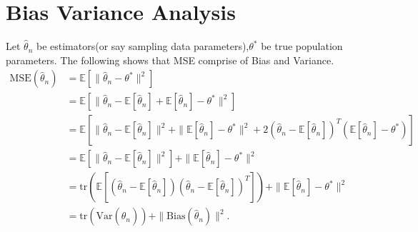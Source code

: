 \documentclass{article}
\begin{document}
\section{Bias Variance Analysis} 
Let \(\hat{\theta}_n\) be estimators(or say sampling data parameters),\(\theta^*\) be true population parameters. The following shows that MSE comprise of Bias and Variance. 
\begin{align*}
\text{MSE}(\hat{\theta}_n) &= \mathbb{E} \left[ \| \hat{\theta}_n - \theta^* \|^2 \right] \\
&= \mathbb{E} \left[ \| \hat{\theta}_n - \mathbb{E}[\hat{\theta}_n] + \mathbb{E}[\hat{\theta}_n] - \theta^* \|^2 \right] \\
&= \mathbb{E} \left[ \| \hat{\theta}_n - \mathbb{E}[\hat{\theta}_n] \|^2 + \| \mathbb{E}[\hat{\theta}_n] - \theta^* \|^2 + 2 (\hat{\theta}_n - \mathbb{E}[\hat{\theta}_n])^T (\mathbb{E}[\hat{\theta}_n] - \theta^*) \right] \\
&= \mathbb{E} \left[ \| \hat{\theta}_n - \mathbb{E}[\hat{\theta}_n] \|^2 \right] + \| \mathbb{E}[\hat{\theta}_n] - \theta^* \|^2 \\
&= \text{tr} \left( \mathbb{E} \left[ (\hat{\theta}_n - \mathbb{E}[\hat{\theta}_n]) (\hat{\theta}_n - \mathbb{E}[\hat{\theta}_n])^T \right] \right) + \| \mathbb{E}[\hat{\theta}_n] - \theta^* \|^2 \\
&= \text{tr} \left( \text{Var}(\hat{\theta}_n) \right) + \| \text{Bias}(\hat{\theta}_n) \|^2.
\end{align*}
\end{document}

